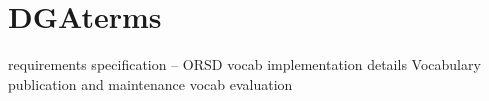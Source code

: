 \section{DGAterms}
\label{sec:dgaterms}

requirements specification -- ORSD
vocab implementation details
Vocabulary publication and maintenance
vocab evaluation